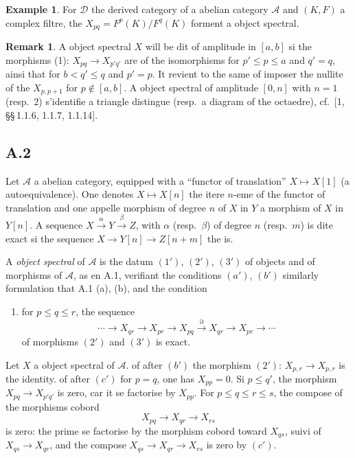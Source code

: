 \documentclass[11pt,a4paper]{article}
\theoremstyle{plain}
\theoremstyle{definition}
\newtheorem{example}[theorem]{Example}
\newtheorem{remark}[theorem]{Remark}
\newcommand{\cD}{\mathscr{D}}
\newcommand{\cA}{\mathscr{A}}
\begin{document}
\begin{example}
For $\cD$ the derived category of a abelian category $\cA$ and $(K,F)$ a complex filtre, the $X_{pq} = F^p(K)/F^q(K)$ forment a object spectral.
\end{example}

\begin{remark}
A object spectral $X$ will be dit of amplitude in $[a,b]$ si the morphisms (1): $X_{pq} \to X_{p'q'}$ are of the isomorphisms for $p' \leqslant p \leqslant a$ and $q' = q$, ainsi that for $b < q' \leqslant q$ and $p' = p$. It revient to the same of imposer the nullite of the $X_{p,p+1}$ for $p \notin [a,b]$. A object spectral of amplitude $[0,n]$ with $n=1$ (resp.~$2$) s'identifie a triangle distingue (resp.~a diagram of the octaedre), cf.~[1, \S\S\,1.1.6, 1.1.7, 1.1.14].
\end{remark}

\subsection*{A.2}
Let $\cA$ a abelian category, equipped with a ``functor of translation'' $X \mapsto X[1]$ (a autoequivalence). One denotes $X \mapsto X[n]$ the itere $n$-eme of the functor of translation and one appelle morphism of degree $n$ of $X$ in $Y$ a morphism of $X$ in $Y[n]$. A sequence $X \xrightarrow{\alpha} Y \xrightarrow{\beta} Z$, with $\alpha$ (resp.~$\beta$) of degree $n$ (resp.~$m$) is dite exact si the sequence $X \to Y[n] \to Z[n+m]$ the is.

A \emph{object spectral} of $\cA$ is the datum $(1')$, $(2')$, $(3')$ of objects and of morphisms of $\cA$, as en A.1, verifiant the conditions $(a')$, $(b')$ similarly formulation that A.1 (a), (b), and the condition
\begin{enumerate}[label=$(c')$]
\item for $p \leqslant q \leqslant r$, the sequence
\[
\cdots \to X_{qr} \to X_{pr} \to X_{pq} \xrightarrow{\partial} X_{qr} \to X_{pr} \to \cdots
\]
of morphisms $(2')$ and $(3')$ is exact.
\end{enumerate}

Let $X$ a object spectral of $\cA$. of after $(b')$ the morphism $(2')$: $X_{p,r} \to X_{p,r}$ is the identity. of after $(c')$ for $p=q$, one has $X_{pp} = 0$. Si $p \leqslant q'$, the morphism $X_{pq} \to X_{p'q'}$ is zero, car it se factorise by $X_{pp}$. For $p \leqslant q \leqslant r \leqslant s$, the compose of the morphisms cobord
\[
X_{pq} \to X_{qr} \to X_{rs}
\]
is zero: the prime se factorise by the morphism cobord toward $X_{qs}$, suivi of $X_{qs} \to X_{qr}$, and the compose $X_{qs} \to X_{qr} \to X_{rs}$ is zero by $(c')$.
\end{document}

